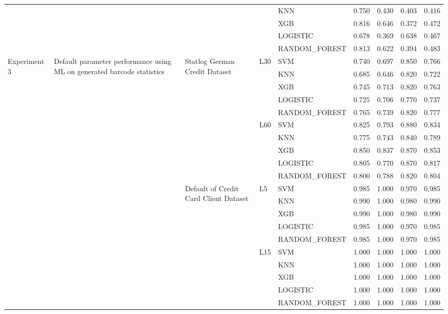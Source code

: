 \begin{table}
\begin{tabular}{lllllrrrr}
 &  &  &  & KNN & 0.750 & 0.430 & 0.403 & 0.416 \\
 &  &  &  & XGB & 0.816 & 0.646 & 0.372 & 0.472 \\
 &  &  &  & LOGISTIC & 0.678 & 0.369 & 0.638 & 0.467 \\
 &  &  &  & RANDOM\_FOREST & 0.813 & 0.622 & 0.394 & 0.483 \\
\cline{1-9} \cline{2-9} \cline{3-9} \cline{4-9}
\multirow[t]{20}{*}{Experiment 3} & \multirow[t]{20}{*}{Default parameter performance using ML on generated barcode statistics} & \multirow[t]{10}{*}{Statlog German Credit Dataset} & \multirow[t]{5}{*}{L30} & SVM & 0.740 & 0.697 & 0.850 & 0.766 \\
 &  &  &  & KNN & 0.685 & 0.646 & 0.820 & 0.722 \\
 &  &  &  & XGB & 0.745 & 0.713 & 0.820 & 0.763 \\
 &  &  &  & LOGISTIC & 0.725 & 0.706 & 0.770 & 0.737 \\
 &  &  &  & RANDOM\_FOREST & 0.765 & 0.739 & 0.820 & 0.777 \\
\cline{4-9}
 &  &  & \multirow[t]{5}{*}{L60} & SVM & 0.825 & 0.793 & 0.880 & 0.834 \\
 &  &  &  & KNN & 0.775 & 0.743 & 0.840 & 0.789 \\
 &  &  &  & XGB & 0.850 & 0.837 & 0.870 & 0.853 \\
 &  &  &  & LOGISTIC & 0.805 & 0.770 & 0.870 & 0.817 \\
 &  &  &  & RANDOM\_FOREST & 0.800 & 0.788 & 0.820 & 0.804 \\
\cline{3-9} \cline{4-9}
 &  & \multirow[t]{10}{*}{Default of Credit Card Client Dataset} & \multirow[t]{5}{*}{L5} & SVM & 0.985 & 1.000 & 0.970 & 0.985 \\
 &  &  &  & KNN & 0.990 & 1.000 & 0.980 & 0.990 \\
 &  &  &  & XGB & 0.990 & 1.000 & 0.980 & 0.990 \\
 &  &  &  & LOGISTIC & 0.985 & 1.000 & 0.970 & 0.985 \\
 &  &  &  & RANDOM\_FOREST & 0.985 & 1.000 & 0.970 & 0.985 \\
\cline{4-9}
 &  &  & \multirow[t]{5}{*}{L15} & SVM & 1.000 & 1.000 & 1.000 & 1.000 \\
 &  &  &  & KNN & 1.000 & 1.000 & 1.000 & 1.000 \\
 &  &  &  & XGB & 1.000 & 1.000 & 1.000 & 1.000 \\
 &  &  &  & LOGISTIC & 1.000 & 1.000 & 1.000 & 1.000 \\
 &  &  &  & RANDOM\_FOREST & 1.000 & 1.000 & 1.000 & 1.000 \\

\end{tabular}
\end{table}

